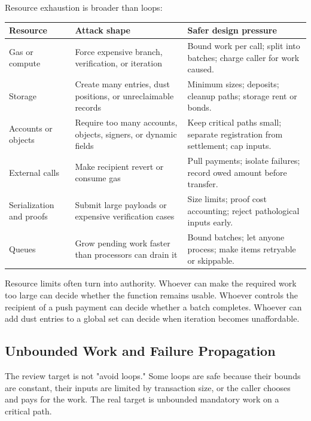Resource exhaustion is broader than loops:

\begin{table}[htbp]
\centering
\small
\renewcommand{\arraystretch}{1.13}
\begin{tabularx}{\textwidth}{@{}>{\RaggedRight\arraybackslash}p{}>{\RaggedRight\arraybackslash}p{}X@{}}
\toprule
Resource & Attack shape & Safer design pressure \\
\midrule
Gas or compute & Force expensive branch, verification, or iteration & Bound work per call; split into batches; charge caller for work caused. \\
Storage & Create many entries, dust positions, or unreclaimable records & Minimum sizes; deposits; cleanup paths; storage rent or bonds. \\
Accounts or objects & Require too many accounts, objects, signers, or dynamic fields & Keep critical paths small; separate registration from settlement; cap inputs. \\
External calls & Make recipient revert or consume gas & Pull payments; isolate failures; record owed amount before transfer. \\
Serialization and proofs & Submit large payloads or expensive verification cases & Size limits; proof cost accounting; reject pathological inputs early. \\
Queues & Grow pending work faster than processors can drain it & Bound batches; let anyone process; make items retryable or skippable. \\
\bottomrule
\end{tabularx}
\end{table}

Resource limits often turn into authority. Whoever can make the required work too large can decide whether the function remains usable. Whoever controls the recipient of a push payment can decide whether a batch completes. Whoever can add dust entries to a global set can decide when iteration becomes unaffordable.

\subsection{Unbounded Work and Failure Propagation}

The review target is not "avoid loops." Some loops are safe because their bounds are constant, their inputs are limited by transaction size, or the caller chooses and pays for the work. The real target is unbounded mandatory work on a critical path.

